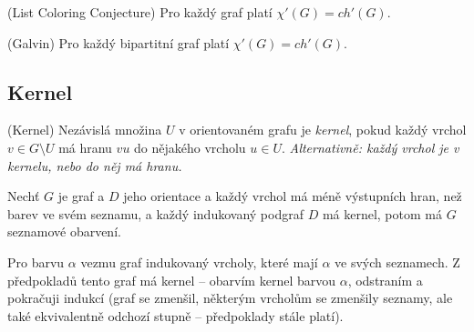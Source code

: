 \vt (List Coloring Conjecture) Pro každý graf platí $\chi'(G) = ch'(G)$.

\vt (Galvin) Pro každý bipartitní graf platí $\chi'(G) = ch'(G)$.

\subsection{Kernel}

\df (Kernel) Nezávislá množina $U$ v orientovaném grafu je {\it kernel}, pokud 
každý vrchol $v\in G \setminus U$ má hranu $vu$ do nějakého vrcholu $u\in U$.  
{\it Alternativně: každý vrchol je v kernelu, nebo do něj má hranu.}

\lm Nechť $G$ je graf a $D$ jeho orientace a každý vrchol má méně výstupních 
hran, než barev ve svém seznamu, a každý indukovaný podgraf $D$ má kernel, potom
má $G$ seznamové obarvení.

\dk Pro barvu $\alpha$ vezmu graf indukovaný vrcholy, které mají $\alpha$ ve 
svých seznamech. Z předpokladů tento graf má kernel -- obarvím kernel barvou 
$\alpha$, odstraním a pokračuji indukcí (graf se zmenšil, některým vrcholům se 
zmenšily seznamy, ale také ekvivalentně odchozí stupně -- předpoklady stále 
platí).
